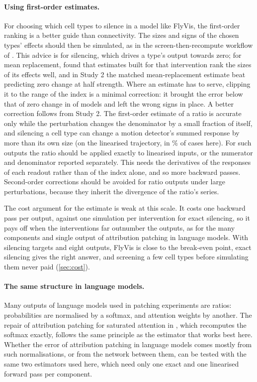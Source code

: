 \paragraph{Using first-order estimates.}
For choosing which cell types to silence in a model like FlyVis, the first-order ranking is a better guide than connectivity. The sizes and signs of the chosen types' effects should then be simulated, as in the screen-then-recompute workflow of \citet{zhang2026attribution}. This advice is for silencing, which drives a type's output towards zero; for mean replacement, \citet{dhawan2026flyhack} found that estimates built for that intervention rank the sizes of its effects well, and in Study 2 the matched mean-replacement estimate beat predicting zero change at half strength. Where an estimate has to serve, clipping it to the range of the index is a minimal correction: it brought the error below that of zero change in \ClipBetterFull{} of \NConfModels{} models and left the wrong signs in place. A better correction follows from Study 2. The first-order estimate of a ratio is accurate only while the perturbation changes the denominator by a small fraction of itself, and silencing a cell type can change a motion detector's summed response by more than its own size (on the linearised trajectory, in \PostLargeDenFrac\% of cases here). For such outputs the ratio should be applied exactly to linearised inputs, or the numerator and denominator reported separately. This needs the derivatives of the \NTrajectories{} responses of each readout rather than of the index alone, and so more backward passes. Second-order corrections should be avoided for ratio outputs under large perturbations, because they inherit the divergence of the ratio's series.

The cost argument for the estimate is weak at this scale. It costs one backward pass per output, against one simulation per intervention for exact silencing, so it pays off when the interventions far outnumber the outputs, as for the many components and single output of attribution patching in language models. With \SimulatedTypes{} silencing targets and eight outputs, FlyVis is close to the break-even point, exact silencing gives the right answer, and screening a few cell types before simulating them never paid (\cref{sec:cost}).

\paragraph{The same structure in language models.}
Many outputs of language models used in patching experiments are ratios: probabilities are normalised by a softmax, and attention weights by another. The repair of attribution patching for saturated attention in \citet{kramar2024atp}, which recomputes the softmax exactly, follows the same principle as the estimator that works best here. Whether the error of attribution patching in language models comes mostly from such normalisations, or from the network between them, can be tested with the same two estimators used here, which need only one exact and one linearised forward pass per component.

